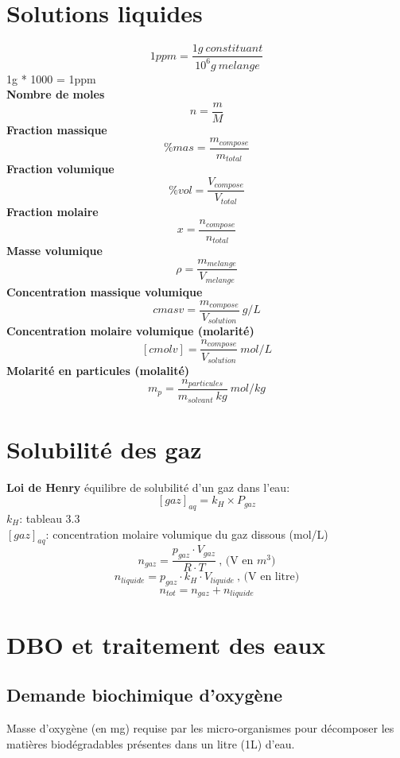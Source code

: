 \documentclass[twocolumn,letterpaper,8pt]{extarticle}
\begin{document}
\clearpage
\section{Solutions liquides}
$$1ppm=\frac{1g\ constituant}{10^6g\ melange}$$
1g * 1000 = 1ppm\\
\textbf{Nombre de moles}
$$n=\frac{m}{M}$$
\textbf{Fraction massique}
$$\%mas = \frac{m_{compose}}{m_{total}}$$
\textbf{Fraction volumique}
$$\%vol = \frac{V_{compose}}{V_{total}}$$
\textbf{Fraction molaire}
$$x = \frac{n_{compose}}{n_{total}}$$
\textbf{Masse volumique}
$$\rho=\frac{m_{melange}}{V_{melange}}$$
\textbf{Concentration massique volumique}
$$cmasv=\frac{m_{compose}}{V_{solution}}\ g/L$$
\textbf{Concentration molaire volumique (molarité)}
$$[cmolv]=\frac{n_{compose}}{V_{solution}}\ mol/L$$
\textbf{Molarité en particules (molalité)}
$$m_p=\frac{n_{particules}}{m_{solvant}\ kg}\ mol/kg$$

\section{Solubilité des gaz}
\textbf{Loi de Henry}
équilibre de solubilité d'un gaz dans l'eau:
$$[gaz]_{aq}=k_H \times P_{gaz}$$
$k_H$: tableau 3.3\\
$[gaz]_{aq}$: concentration molaire volumique du gaz dissous (mol/L)\\

$$n_{gaz}=\frac{p_{gaz} \cdot V_{gaz}}{R \cdot T}\ \textrm{, (V en $m^3$)}$$
$$n_{liquide}=p_{gaz}\cdot k_{H} \cdot V_{liquide}\ \textrm{, (V en litre)}$$
$$n_{tot}=n_{gaz} + n_{liquide}$$

\section{DBO et traitement des eaux}

\subsection{Demande biochimique d'oxygène}
Masse d'oxygène (en mg) requise par les micro-organismes pour décomposer les matières biodégradables présentes dans un litre (1L) d'eau.
\end{document}
